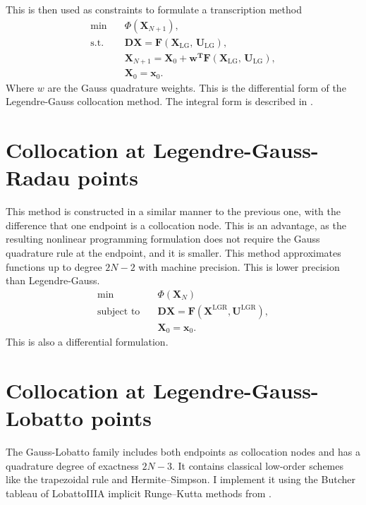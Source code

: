 This is then used as constraints to formulate a transcription method
\begin{equation}
    \begin{aligned}
        \min \quad        & \Phi(\mathbf{X}_{N+1})                         ,                                                \\
        \text{s.t.} \quad & \mathbf{DX} = \mathbf{F}(\mathbf{X}_\text{LG},\, \mathbf{U}_\text{LG})      ,                            \\
                          & \mathbf{X}_{N+1} = \mathbf{X}_0 + \mathbf{w^T} \mathbf{F}(\mathbf{X}_\text{LG},\, \mathbf{U}_\text{LG}), \\
                          & \mathbf{X}_0 = \mathbf{x}_0.
    \end{aligned}
\end{equation}
Where $w$ are the Gauss quadrature weights.
This is the differential form of the Legendre-Gauss collocation method. The integral form is described in \cite{gargUnifiedFrameworkNumerical2010}.
\section{Collocation at Legendre-Gauss-Radau points}
This method is constructed in a similar manner to the previous one, with the difference that one endpoint is a collocation node. This is an advantage, as the resulting nonlinear programming formulation does not require the Gauss quadrature rule at the endpoint, and it is smaller.
This method approximates functions up to degree $2N-2$ with machine precision. This is lower precision than Legendre-Gauss.
\begin{equation}
\begin{aligned}
\min \quad & \Phi(\mathbf{X}_N) \\
\text{subject to} \quad & \mathbf{D}\mathbf{X} = \mathbf{F}(\mathbf{X}^{\mathrm{LGR}}, \mathbf{U}^{\mathrm{LGR}}), \\
& \mathbf{X}_0 = \mathbf{x}_0.
\end{aligned}
\end{equation}
This is also a differential formulation.
\section{Collocation at Legendre-Gauss-Lobatto points}
The Gauss-Lobatto family includes both endpoints as collocation nodes and has a quadrature degree of exactness $2N-3$. It contains classical low-order schemes like the trapezoidal rule and Hermite--Simpson. I implement it using the Butcher tableau of LobattoIIIA implicit Runge--Kutta methods from \cite{ehlePadeApproximationsExponential}.

